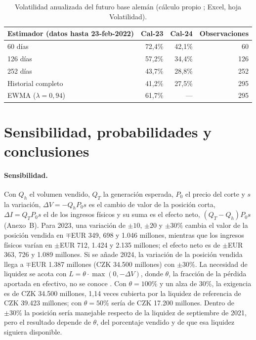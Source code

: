 \documentclass[11pt,letterpaper]{article}
\theoremstyle{plain}
\theoremstyle{definition}
\theoremstyle{remark}
\numberwithin{equation}{section}
\newcommand{\sw}{\begin{singlespace}}
\newcommand{\ew}{\end{singlespace}}
\begin{document}
\sw
\begin{table}[ht]
	\centering
	\footnotesize
		\begin{tabular}{lrrr}
			\toprule
				Estimador (datos hasta 23-feb-2022) & Cal-23 & Cal-24 & Observaciones \\
			\midrule
				60 días & 72,4\% & 42,1\% & 60 \\
				126 días & 57,2\% & 34,4\% & 126 \\
				252 días & 43,7\% & 28,8\% & 252 \\
				Historial completo & 41,2\% & 27,5\% & 295 \\
				EWMA ($\lambda=0{,}94$) & 61,7\% & --- & 295 \\
			\bottomrule
		\end{tabular}
	\caption{Volatilidad anualizada del futuro base alemán (cálculo propio ; Excel, hoja Volatilidad).}
	\label{tab:vol}
\end{table}
\ew

\section{Sensibilidad, probabilidades y conclusiones}\label{sec:sens}

\paragraph{Sensibilidad.} Con $Q_h$ el volumen vendido, $Q_T$ la generación esperada, 
$P_0$ el precio del corte y $s$ la variación, $\Delta V=-Q_hP_0s$ es el cambio de valor de 
la posición corta, $\Delta I=Q_TP_0s$ el de los ingresos físicos y su suma es el efecto neto,
 $(Q_T-Q_h)P_0s$ (Anexo~B). Para 2023, una variación de $\pm10$, $\pm20$ y $\pm30\%$ cambia 
 el valor de la posición vendida en $\mp$EUR 349, 698 y 1.046 millones, mientras que los 
 ingresos físicos varían en $\pm$EUR 712, 1.424 y 2.135 millones; el efecto neto es de 
 $\pm$EUR 363, 726 y 1.089 millones. Si se añade 2024, la variación de la posición vendida 
 llega a $\mp$EUR 1.387 millones (CZK 34.500 millones) con $\pm30\%$. La necesidad de 
 liquidez se acota con $L=\theta\cdot\max(0,-\Delta V)$, donde $\theta$, la fracción de la 
 pérdida aportada en efectivo, no se conoce . Con $\theta=100\%$ y un alza de 30\%, 
 la exigencia es de CZK 34.500 millones, 1,14 veces cubierta por la liquidez de referencia 
 de CZK 39.423 millones; con $\theta=50\%$ sería de CZK 17.200 millones. Dentro de $\pm30\%$ 
 la posición sería manejable respecto de la liquidez de septiembre de 2021, pero el resultado 
 depende de $\theta$, del porcentaje vendido y de que esa liquidez siguiera disponible.
\end{document}
